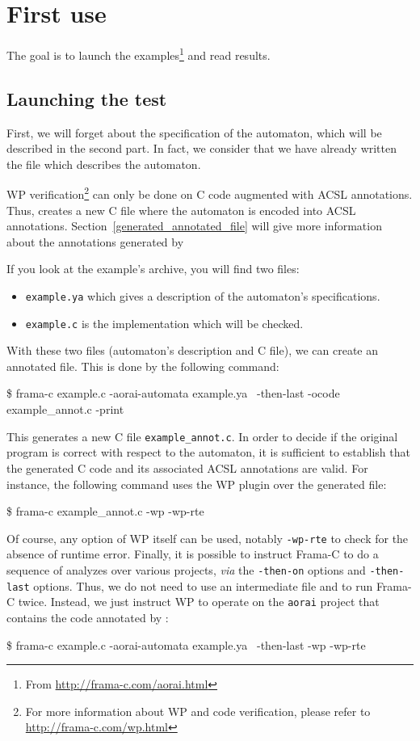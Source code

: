 \documentclass{frama-c-book}
\begin{document}
\section{First use}
\label{first_use}
  The goal is to launch the examples\footnote{ From \url{http://frama-c.com/aorai.html}} and read results.
\subsection{Launching the test}
  First, we will forget about the specification of the automaton,
  which will be described in the second part. In fact, we consider
  that we have already written the file which describes the automaton.

  WP verification\footnote{For more information about WP
    and code verification, please refer to
    \url{http://frama-c.com/wp.html}} can only be done on C
  code augmented with ACSL annotations. Thus,
  \aorai creates a new C file where the automaton is encoded into ACSL
  annotations. Section~\ref{generated_annotated_file} will give more
  information about the annotations generated by \aorai

  If you look at the example's archive, you will find two files:
\begin{itemize}
  \item \texttt{example.ya} which gives a description of the automaton's
    specifications.
  \item \texttt{example.c} is the implementation which will be checked.
\end{itemize}

 With these two files (automaton's description and C file), we can create an
annotated file. This
is done by the following command:
\begin{frama-c-commands}
\$ frama-c example.c -aorai-automata example.ya \
          -then-last -ocode example_annot.c -print
\end{frama-c-commands} %

This generates a new C file \texttt{example\_annot.c}.
In order to decide if the original program is correct with respect to
the automaton, it is sufficient to establish that the generated C code and
its associated ACSL annotations are valid. For instance, the following command
uses the WP plugin over the generated file:
\begin{frama-c-commands}
\$ frama-c example_annot.c -wp -wp-rte
\end{frama-c-commands} %

Of course, any option of WP itself can be used, notably \texttt{-wp-rte} to
check for the absence of runtime error.
Finally, it is possible to instruct Frama-C to do a
sequence of analyzes over various projects, {\it via} the \texttt{-then-on}
options and \texttt{-then-last} options.
Thus, we do not need to use an intermediate file and to run Frama-C
twice. Instead, we just instruct WP to operate on the \texttt{aorai}
project that contains the code annotated by \aorai:
\begin{frama-c-commands}
\$ frama-c example.c -aorai-automata example.ya \
          -then-last -wp -wp-rte
\end{frama-c-commands} %
\end{document}
